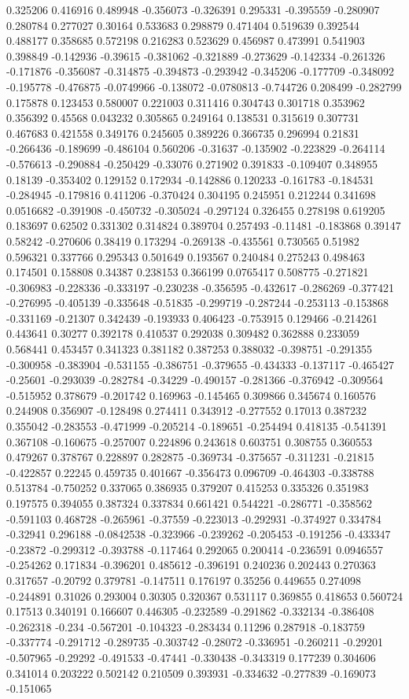 0.325206 0.416916 0.489948 -0.356073 -0.326391 0.295331 -0.395559 -0.280907 0.280784 0.277027 0.30164 0.533683 0.298879 0.471404 0.519639 0.392544 0.488177 0.358685 0.572198 0.216283 0.523629 0.456987 0.473991 0.541903 0.398849 -0.142936 -0.39615 -0.381062 -0.321889 -0.273629 -0.142334 -0.261326 -0.171876 -0.356087 -0.314875 -0.394873 -0.293942 -0.345206 -0.177709 -0.348092 -0.195778 -0.476875 -0.0749966 -0.138072 -0.0780813 -0.744726 0.208499 -0.282799 0.175878 0.123453 0.580007 0.221003 0.311416 0.304743 0.301718 0.353962 0.356392 0.45568 0.043232 0.305865 0.249164 0.138531 0.315619 0.307731 0.467683 0.421558 0.349176 0.245605 0.389226 0.366735 0.296994 0.21831 -0.266436 -0.189699 -0.486104 0.560206 -0.31637 -0.135902 -0.223829 -0.264114 -0.576613 -0.290884 -0.250429 -0.33076 0.271902 0.391833 -0.109407 0.348955 0.18139 -0.353402 0.129152 0.172934 -0.142886 0.120233 -0.161783 -0.184531 -0.284945 -0.179816 0.411206 -0.370424 0.304195 0.245951 0.212244 0.341698 0.0516682 -0.391908 -0.450732 -0.305024 -0.297124 0.326455 0.278198 0.619205 0.183697 0.62502 0.331302 0.314824 0.389704 0.257493 -0.11481 -0.183868 0.39147 0.58242 -0.270606 0.38419 0.173294 -0.269138 -0.435561 0.730565 0.51982 0.596321 0.337766 0.295343 0.501649 0.193567 0.240484 0.275243 0.498463 0.174501 0.158808 0.34387 0.238153 0.366199 0.0765417 0.508775 -0.271821 -0.306983 -0.228336 -0.333197 -0.230238 -0.356595 -0.432617 -0.286269 -0.377421 -0.276995 -0.405139 -0.335648 -0.51835 -0.299719 -0.287244 -0.253113 -0.153868 -0.331169 -0.21307 0.342439 -0.193933 0.406423 -0.753915 0.129466 -0.214261 0.443641 0.30277 0.392178 0.410537 0.292038 0.309482 0.362888 0.233059 0.568441 0.453457 0.341323 0.381182 0.387253 0.388032 -0.398751 -0.291355 -0.300958 -0.383904 -0.531155 -0.386751 -0.379655 -0.434333 -0.137117 -0.465427 -0.25601 -0.293039 -0.282784 -0.34229 -0.490157 -0.281366 -0.376942 -0.309564 -0.515952 0.378679 -0.201742 0.169963 -0.145465 0.309866 0.345674 0.160576 0.244908 0.356907 -0.128498 0.274411 0.343912 -0.277552 0.17013 0.387232 0.355042 -0.283553 -0.471999 -0.205214 -0.189651 -0.254494 0.418135 -0.541391 0.367108 -0.160675 -0.257007 0.224896 0.243618 0.603751 0.308755 0.360553 0.479267 0.378767 0.228897 0.282875 -0.369734 -0.375657 -0.311231 -0.21815 -0.422857 0.22245 0.459735 0.401667 -0.356473 0.096709 -0.464303 -0.338788 0.513784 -0.750252 0.337065 0.386935 0.379207 0.415253 0.335326 0.351983 0.197575 0.394055 0.387324 0.337834 0.661421 0.544221 -0.286771 -0.358562 -0.591103 0.468728 -0.265961 -0.37559 -0.223013 -0.292931 -0.374927 0.334784 -0.32941 0.296188 -0.0842538 -0.323966 -0.239262 -0.205453 -0.191256 -0.433347 -0.23872 -0.299312 -0.393788 -0.117464 0.292065 0.200414 -0.236591 0.0946557 -0.254262 0.171834 -0.396201 0.485612 -0.396191 0.240236 0.202443 0.270363 0.317657 -0.20792 0.379781 -0.147511 0.176197 0.35256 0.449655 0.274098 -0.244891 0.31026 0.293004 0.30305 0.320367 0.531117 0.369855 0.418653 0.560724 0.17513 0.340191 0.166607 0.446305 -0.232589 -0.291862 -0.332134 -0.386408 -0.262318 -0.234 -0.567201 -0.104323 -0.283434 0.11296 0.287918 -0.183759 -0.337774 -0.291712 -0.289735 -0.303742 -0.28072 -0.336951 -0.260211 -0.29201 -0.507965 -0.29292 -0.491533 -0.47441 -0.330438 -0.343319 0.177239 0.304606 0.341014 0.203222 0.502142 0.210509 0.393931 -0.334632 -0.277839 -0.169073 -0.151065 